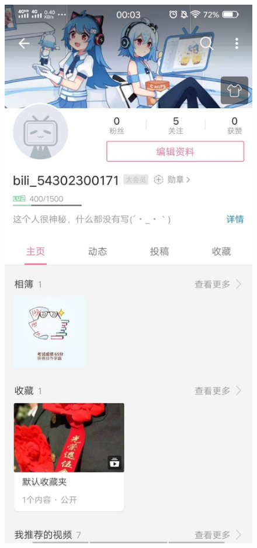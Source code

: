 \documentclass{article}
\begin{document}
      \begin{figure}[H]
    	\centering
    	\includegraphics[scale=0.3]{bilibili}
    	\caption{}
    	\label{fig:bilibili}
    \end{figure}
\end{document}
